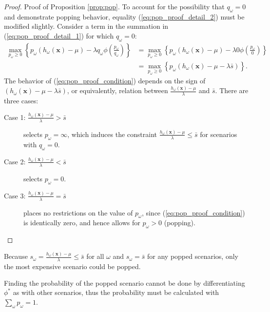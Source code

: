 \documentclass[ijoc,letterpaper]{informs3} %
\newcommand{\x}{\mathbf{x}}
\begin{document}
\begin{proof}{\sc Proof of Proposition \ref{prop:pop}.}
	To account for the possibility that $q_\omega = 0$ and demonstrate popping behavior, equality (\ref{eq:pop_proof_detail_2}) must be modified slightly.
	Consider a term in the summation in (\ref{eq:pop_proof_detail_1}) for which $q_\omega = 0$:
	\begin{align}
		\max_{p_\omega \geq 0} \left\{ p_\omega (h_\omega(\x) - \mu) - \lambda q_\omega  \phi\left(\frac{p_\omega}{q_\omega}\right) \right\} & = \max_{p_\omega \geq 0} \left\{ p_\omega (h_\omega(\x) - \mu) - \lambda 0  \phi\left(\frac{p_\omega}{0}\right) \right\} \nonumber \\
		& = \max_{p_\omega \geq 0} \left\{ p_\omega \left( h_\omega(\x) - \mu - \lambda \bar{s} \right) \right\}. \label{eq:pop_proof_condition}
	\end{align}
	The behavior of (\ref{eq:pop_proof_condition}) depends on the sign of $\left( h_\omega(\x) - \mu - \lambda \bar{s}  \right)$, or equivalently, relation between $\frac{h_\omega(\x) - \mu}{\lambda}$ and $\bar{s}$.
	There are three cases:
	\begin{description}
		\item[Case 1: $\frac{h_\omega(\x) - \mu}{\lambda} > \bar{s}$] selects $p_\omega = \infty$, which induces the constraint $\frac{h_\omega(\x) - \mu}{\lambda} \leq \bar{s}$ for scenarios with $q_\omega = 0$.
		\item[Case 2: $\frac{h_\omega(\x) - \mu}{\lambda} < \bar{s}$] selects $p_\omega = 0$.
		\item[Case 3: $\frac{h_\omega(\x) - \mu}{\lambda} = \bar{s}$] places no restrictions on the value of $p_\omega$, since (\ref{eq:pop_proof_condition}) is identically zero, and hence allows for $p_\omega > 0$ (popping). \Halmos %
	\end{description}
\end{proof}

\begin{remark}
	Because $s_\omega = \frac{h_\omega(\x) - \mu}{\lambda} \leq \bar{s}$ for all $\omega$ and $s_\omega = \bar{s}$ for any popped scenarios, only the most expensive scenario could be popped.
\end{remark}

\begin{remark}
	Finding the probability of the popped scenario cannot be done by differentiating $\phi^*$ as with other scenarios, thus the probability must be calculated with $\sum_\omega p_\omega = 1$.
\end{remark}

\end{document}
